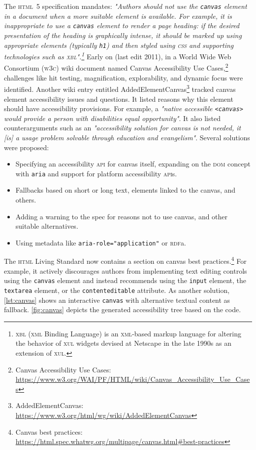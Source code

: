 \documentclass[sigconf]{acmart}
\begin{document}
The \textsc{html}\ 5 specification mandates: \textit{"Authors should not use the \texttt{canvas} element in a document when a more suitable element is available. For example, it is inappropriate to use a \texttt{canvas} element to render a page heading: if the desired presentation of the heading is graphically intense, it should be marked up using appropriate elements (typically \texttt{h1}) and then styled using \textsc{css} and supporting technologies such as \textsc{xbl}".\footnote{\textsc{xbl} (\textsc{xml} Binding Language) is an \textsc{xml}-based markup language for altering the behavior of \textsc{xul} widgets devised at Netscape in the late 1990s as an extension of \textsc{xul}.}} Early on (last edit 2011), in a World Wide Web Consortium (\textsc{w3c}) wiki document named Canvas Accessibility Use Cases,\footnote{Canvas Accessibility Use Cases: \url{https://www.w3.org/WAI/PF/HTML/wiki/Canvas_Accessibility_Use_Cases}} challenges like hit testing, magnification, explorability, and dynamic focus were identified. Another wiki entry entitled AddedElementCanvas\footnote{AddedElementCanvas: \url{https://www.w3.org/html/wg/wiki/AddedElementCanvas}} tracked canvas element accessibility issues and questions. It listed reasons why this element should have accessibility provisions. For example, a \textit{"native accessible \texttt{<canvas>} would provide a person with disabilities equal opportunity"}. It also listed counterarguments such as an \textit{"accessibility solution for canvas is not needed, it [is] a usage problem solvable through education and evangelism"}. Several solutions were proposed:

\begin{itemize}
    \item Specifying an accessibility \textsc{api} for canvas itself, expanding on the \textsc{dom} concept with \texttt{aria} and support for platform accessibility \textsc{api}s.
    \item Fallbacks based on short or long text, elements linked to the canvas, and others.
    \item Adding a warning to the spec for reasons not to use canvas, and other suitable alternatives.
    \item Using metadata like \texttt{aria-role="application"} or \textsc{rdf}a.
\end{itemize}

The \textsc{html} Living Standard now contains a section on canvas best practices.\footnote{Canvas best practices: \url{https://html.spec.whatwg.org/multipage/canvas.html#best-practices}} For example, it actively discourages authors from implementing text editing controls using the \texttt{canvas} element and instead recommends using the \texttt{input} element, the \texttt{textarea} element, or the \texttt{contenteditable} attribute. As another solution, \autoref{lst:canvas} shows an interactive \texttt{canvas} with alternative textual content as fallback. \autoref{fig:canvas} depicts the generated accessibility tree based on the code.
\end{document}
